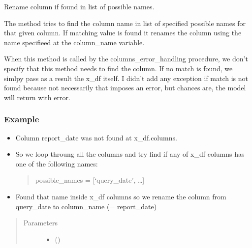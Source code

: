 \documentclass[letterpaper,10pt,english]{sphinxmanual}
\begin{document}
\begin{fulllineitems}
\label{\detokenize{source/optimization.datatools:optimization.datatools.dataprep.try_possible_names}}
Rename column if found in list of possible names.

The method tries to find the column name in list of
specified possible names for that given column. If matching
value is found it renames the column using the name
specifieed at the column\_name variable.

When this method is called by the columns\_error\_handling
procedure, we don’t specify that this method needs to find the
column. If no match is found, we simlpy pass as a result the x\_df
itself. I didn’t add any exception if match is not found because not
necessarily that imposes an error, but chances are, the model will
return with error.
\subsubsection*{Example}
\begin{itemize}
\item {} 
Column report\_date was not found at x\_df.columns.

\item {} 
So we loop throung all the columns and try find if any of x\_df columns has one of the following names:
\begin{quote}

possible\_names = {[}‘query\_date’, …{]}
\end{quote}

\item {} 
Found that name inside x\_df columns so we rename the column from  query\_date to column\_name (= report\_date)

\end{itemize}
\begin{quote}\begin{description}
\item[{Parameters}] \leavevmode\begin{itemize}
\item {} 
 () \textendash{} 


\end{itemize}
\end{description}
\end{quote}
\end{fulllineitems}
\end{document}
